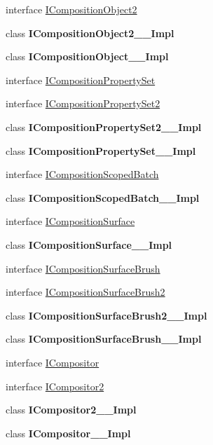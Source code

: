 \begin{DoxyCompactItemize}
\item 
interface \hyperlink{interface_windows_1_1_u_i_1_1_composition_1_1_i_composition_object2}{I\+Composition\+Object2}
\item 
class {\bfseries I\+Composition\+Object2\+\_\+\+\_\+\+Impl}
\item 
class {\bfseries I\+Composition\+Object\+\_\+\+\_\+\+Impl}
\item 
interface \hyperlink{interface_windows_1_1_u_i_1_1_composition_1_1_i_composition_property_set}{I\+Composition\+Property\+Set}
\item 
interface \hyperlink{interface_windows_1_1_u_i_1_1_composition_1_1_i_composition_property_set2}{I\+Composition\+Property\+Set2}
\item 
class {\bfseries I\+Composition\+Property\+Set2\+\_\+\+\_\+\+Impl}
\item 
class {\bfseries I\+Composition\+Property\+Set\+\_\+\+\_\+\+Impl}
\item 
interface \hyperlink{interface_windows_1_1_u_i_1_1_composition_1_1_i_composition_scoped_batch}{I\+Composition\+Scoped\+Batch}
\item 
class {\bfseries I\+Composition\+Scoped\+Batch\+\_\+\+\_\+\+Impl}
\item 
interface \hyperlink{interface_windows_1_1_u_i_1_1_composition_1_1_i_composition_surface}{I\+Composition\+Surface}
\item 
class {\bfseries I\+Composition\+Surface\+\_\+\+\_\+\+Impl}
\item 
interface \hyperlink{interface_windows_1_1_u_i_1_1_composition_1_1_i_composition_surface_brush}{I\+Composition\+Surface\+Brush}
\item 
interface \hyperlink{interface_windows_1_1_u_i_1_1_composition_1_1_i_composition_surface_brush2}{I\+Composition\+Surface\+Brush2}
\item 
class {\bfseries I\+Composition\+Surface\+Brush2\+\_\+\+\_\+\+Impl}
\item 
class {\bfseries I\+Composition\+Surface\+Brush\+\_\+\+\_\+\+Impl}
\item 
interface \hyperlink{interface_windows_1_1_u_i_1_1_composition_1_1_i_compositor}{I\+Compositor}
\item 
interface \hyperlink{interface_windows_1_1_u_i_1_1_composition_1_1_i_compositor2}{I\+Compositor2}
\item 
class {\bfseries I\+Compositor2\+\_\+\+\_\+\+Impl}
\item 
class {\bfseries I\+Compositor\+\_\+\+\_\+\+Impl}
\item 

\end{DoxyCompactItemize}
